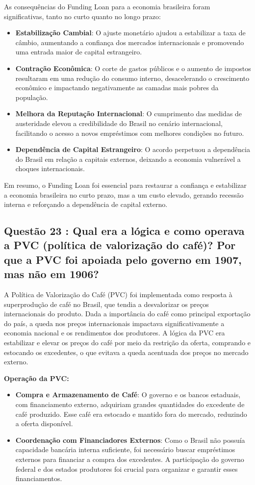 \documentclass[a4paper,12pt]{article}[abntex2]
\begin{document}
As consequências do Funding Loan para a economia brasileira foram significativas, tanto no curto quanto no longo prazo:
\begin{itemize}
    \item \textbf{Estabilização Cambial}: O ajuste monetário ajudou a estabilizar a taxa de câmbio, aumentando a confiança dos mercados internacionais e promovendo uma entrada maior de capital estrangeiro.
    \item \textbf{Contração Econômica}: O corte de gastos públicos e o aumento de impostos resultaram em uma redução do consumo interno, desacelerando o crescimento econômico e impactando negativamente as camadas mais pobres da população.
    \item \textbf{Melhora da Reputação Internacional}: O cumprimento das medidas de austeridade elevou a credibilidade do Brasil no cenário internacional, facilitando o acesso a novos empréstimos com melhores condições no futuro.
    \item \textbf{Dependência de Capital Estrangeiro}: O acordo perpetuou a dependência do Brasil em relação a capitais externos, deixando a economia vulnerável a choques internacionais.
\end{itemize}

Em resumo, o Funding Loan foi essencial para restaurar a confiança e estabilizar a economia brasileira no curto prazo, mas a um custo elevado, gerando recessão interna e reforçando a dependência de capital externo.

\subsection{\textbf{Questão 23 : Qual era a lógica e como operava a PVC (política de valorização do café)? Por que a PVC foi apoiada pelo governo em 1907, mas não em 1906?}}

A Política de Valorização do Café (PVC) foi implementada como resposta à superprodução de café no Brasil, que tendia a desvalorizar os preços internacionais do produto. Dada a importância do café como principal exportação do país, a queda nos preços internacionais impactava significativamente a economia nacional e os rendimentos dos produtores. A lógica da PVC era estabilizar e elevar os preços do café por meio da restrição da oferta, comprando e estocando os excedentes, o que evitava a queda acentuada dos preços no mercado externo.

\textbf{Operação da PVC:}
\begin{itemize}
    \item \textbf{Compra e Armazenamento de Café}: O governo e os bancos estaduais, com financiamento externo, adquiriam grandes quantidades do excedente de café produzido. Esse café era estocado e mantido fora do mercado, reduzindo a oferta disponível.
    \item \textbf{Coordenação com Financiadores Externos}: Como o Brasil não possuía capacidade bancária interna suficiente, foi necessário buscar empréstimos externos para financiar a compra dos excedentes. A participação do governo federal e dos estados produtores foi crucial para organizar e garantir esses financiamentos.
\end{itemize}
\end{document}
